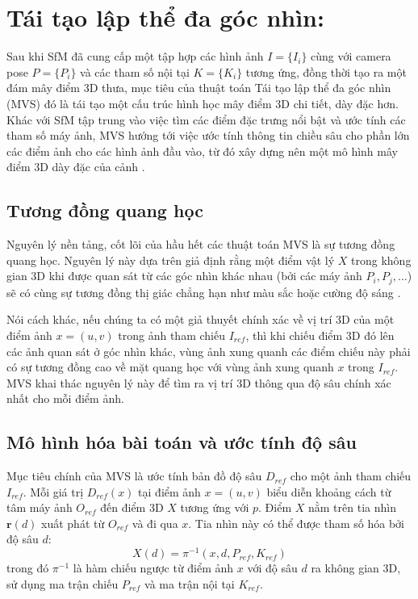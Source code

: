\section{Tái tạo lập thể đa góc nhìn:}
\label{sec:mvs}

Sau khi SfM đã cung cấp một tập hợp các hình ảnh $I = \{I_i\}$ cùng với camera pose $P = \{P_i\}$ và các tham số nội tại $K = \{K_i\}$ tương ứng, đồng thời tạo ra một đám mây điểm 3D thưa, mục tiêu của thuật toán Tái tạo lập thể đa góc nhìn (MVS) đó là tái tạo một cấu trúc hình học mây điểm 3D chi tiết, dày đặc hơn. Khác với SfM tập trung vào việc tìm các điểm đặc trưng nổi bật và ước tính các tham số máy ảnh, MVS hướng tới việc ước tính thông tin chiều sâu cho phần lớn các điểm ảnh cho các hình ảnh đầu vào, từ đó xây dựng nên một mô hình mây điểm 3D dày đặc của cảnh \cite{Seitz2006comparison, Furukawa2015multi}.

\subsection{Tương đồng quang học}
\label{subsec:mvs_principle}

Nguyên lý nền tảng, cốt lõi của hầu hết các thuật toán MVS là sự tương đồng quang học. Nguyên lý này dựa trên giả định rằng một điểm vật lý $X$ trong không gian 3D khi được quan sát từ các góc nhìn khác nhau (bởi các máy ảnh $P_i, P_j, ...$) sẽ có cùng sự tương đồng thị giác chẳng hạn như màu sắc hoặc cường độ sáng \cite{Seitz2006comparison}.

Nói cách khác, nếu chúng ta có một giả thuyết chính xác về vị trí 3D của một điểm ảnh $x = (u, v)$ trong ảnh tham chiếu $I_{ref}$, thì khi chiếu điểm 3D đó lên các ảnh quan sát ở góc nhìn khác, vùng ảnh xung quanh các điểm chiếu này phải có sự tương đồng cao về mặt quang học với vùng ảnh xung quanh $x$ trong $I_{ref}$. MVS khai thác nguyên lý này để tìm ra vị trí 3D thông qua độ sâu chính xác nhất cho mỗi điểm ảnh.

\subsection{Mô hình hóa bài toán và ước tính độ sâu}
\label{subsec:mvs_formulation}

Mục tiêu chính của MVS là ước tính bản đồ độ sâu $D_{ref}$ cho một ảnh tham chiếu $I_{ref}$. Mỗi giá trị $D_{ref}(x)$ tại điểm ảnh $x = (u,v)$ biểu diễn khoảng cách từ tâm máy ảnh $O_{ref}$ đến điểm 3D $X$ tương ứng với $p$. Điểm $X$ nằm trên tia nhìn $\mathbf{r}(d)$ xuất phát từ $O_{ref}$ và đi qua $x$. Tia nhìn này có thể được tham số hóa bởi độ sâu $d$:
\begin{equation}
    X(d) = \pi^{-1}(x, d, P_{ref}, K_{ref})
\end{equation}
trong đó $\pi^{-1}$ là hàm chiếu ngược từ điểm ảnh $x$ với độ sâu $d$ ra không gian 3D, sử dụng ma trận chiếu $P_{ref}$ và ma trận nội tại $K_{ref}$.

